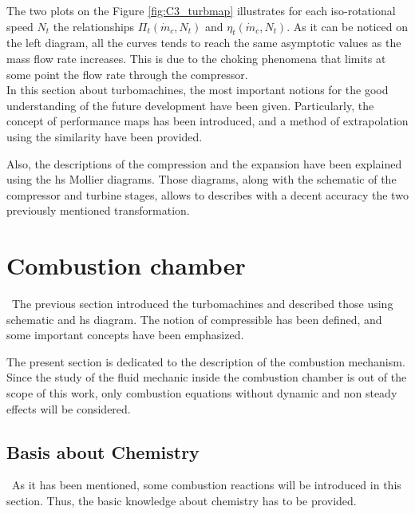 The two plots on the Figure \ref{fig:C3_turbmap} illustrates for each iso-rotational speed $N_t$ the relationships $\Pi_t(\dot{m}_c,N_t)$ and $\eta_t(\dot{m}_c,N_t)$. As it can be noticed on the left diagram, all the curves tends to reach the same asymptotic values as the mass flow rate increases. This is due to the choking phenomena that limits at some point the flow rate through the compressor.\\

In this section about turbomachines, the most important notions for the good understanding of the future development have been given. Particularly, the concept of performance maps has been introduced, and a method of extrapolation using the similarity have been provided. 

Also, the descriptions of the compression and the expansion have been explained using the hs Mollier diagrams. Those diagrams, along with the schematic of the compressor and turbine stages, allows to describes with a decent accuracy the two previously mentioned transformation.
\newpage
\section{Combustion chamber}
\quad\, The previous section introduced the turbomachines and described those using schematic and hs diagram. The notion of compressible has been defined, and some important concepts have been emphasized. 

The present section is dedicated to the description of the combustion mechanism. Since the study of the fluid mechanic inside the combustion chamber is out of the scope of this work, only combustion equations without dynamic and non steady effects will be considered.

\subsection{Basis about Chemistry}
\quad\, As it has been mentioned, some combustion reactions will be introduced in this section. Thus, the basic knowledge about chemistry has to be provided.\\

